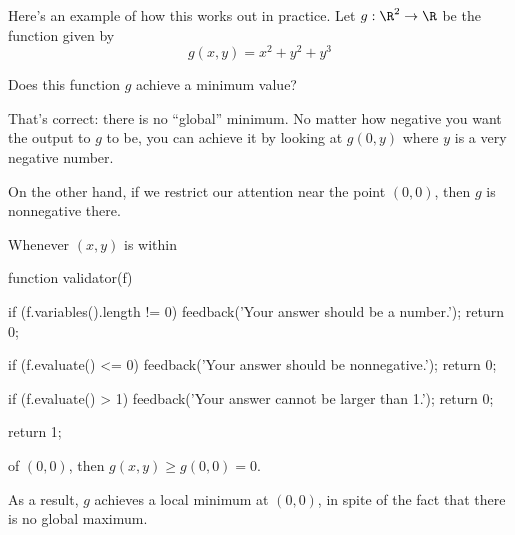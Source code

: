 \documentclass{ximera}
\begin{document}
Here's an example of how this works out in practice.  Let $g : \R^2
\to \R$ be the function given by
$$
g(x,y) = x^2 + y^2 + y^3
$$
\begin{question}
  Does this function $g$ achieve a minimum value?

  \begin{solution}
    \begin{multiple-choice}
    \end{multiple-choice}
  \end{solution}

  That's correct: there is no ``global'' minimum.  No matter how
  negative you want the output to $g$ to be, you can achieve it by
  looking at $g(0,y)$ where $y$ is a very negative number.

  On the other hand, if we restrict our attention near the point
  $(0,0)$, then $g$ is nonnegative there.
  \begin{solution}
    Whenever $(x,y)$ is within \begin{expression-answer}
      function validator(f) {
        if (f.variables().length != 0) {
          feedback('Your answer should be a number.');
          return 0;
        }

        if (f.evaluate({}) <= 0) {
          feedback('Your answer should be nonnegative.');
          return 0;
        }

        if (f.evaluate({}) > 1) {
          feedback('Your answer cannot be larger than 1.');
          return 0;
        }
        
        return 1;
      }
    \end{expression-answer} of $(0,0)$, then $g(x,y) \geq g(0,0) = 0$.
  \end{solution}

  As a result, $g$ achieves a local minimum at $(0,0)$, in spite of
  the fact that there is no global maximum.
\end{question}
\end{document}
